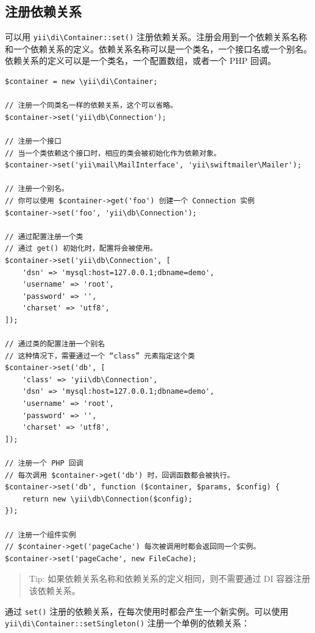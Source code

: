 \subsection{注册依赖关系 \label{concept-di-container.md::registering-dependencies}}
可以用 \texttt{yii{\allowbreak{}\textbackslash}di{\allowbreak{}\textbackslash}Container\allowbreak{}::\allowbreak{}set()} 注册依赖关系。注册会用到一个依赖关系名称和一个依赖关系的定义。依赖关系名称可以是一个类名，一个接口名或一个别名。依赖关系的定义可以是一个类名，一个配置数组，或者一个 PHP 回调。

\lstset{language=php}\begin{lstlisting}
$container = new \yii\di\Container;

// 注册一个同类名一样的依赖关系，这个可以省略。
$container->set('yii\db\Connection');

// 注册一个接口
// 当一个类依赖这个接口时，相应的类会被初始化作为依赖对象。
$container->set('yii\mail\MailInterface', 'yii\swiftmailer\Mailer');

// 注册一个别名。
// 你可以使用 $container->get('foo') 创建一个 Connection 实例
$container->set('foo', 'yii\db\Connection');

// 通过配置注册一个类
// 通过 get() 初始化时，配置将会被使用。
$container->set('yii\db\Connection', [
    'dsn' => 'mysql:host=127.0.0.1;dbname=demo',
    'username' => 'root',
    'password' => '',
    'charset' => 'utf8',
]);

// 通过类的配置注册一个别名
// 这种情况下，需要通过一个 “class” 元素指定这个类
$container->set('db', [
    'class' => 'yii\db\Connection',
    'dsn' => 'mysql:host=127.0.0.1;dbname=demo',
    'username' => 'root',
    'password' => '',
    'charset' => 'utf8',
]);

// 注册一个 PHP 回调
// 每次调用 $container->get('db') 时，回调函数都会被执行。
$container->set('db', function ($container, $params, $config) {
    return new \yii\db\Connection($config);
});

// 注册一个组件实例
// $container->get('pageCache') 每次被调用时都会返回同一个实例。
$container->set('pageCache', new FileCache);
\end{lstlisting}
\begin{quote}Tip: 如果依赖关系名称和依赖关系的定义相同，则不需要通过 DI 容器注册该依赖关系。

\end{quote}
通过 \lstinline|set()| 注册的依赖关系，在每次使用时都会产生一个新实例。可以使用 \texttt{yii{\allowbreak{}\textbackslash}di{\allowbreak{}\textbackslash}Container\allowbreak{}::\allowbreak{}setSingleton()} 注册一个单例的依赖关系：

